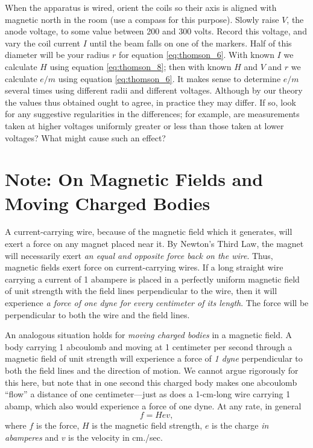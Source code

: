 When the apparatus is wired, orient the coils so their axis is aligned
with magnetic north in the room (use a compass for
this purpose). Slowly raise $V$, the anode voltage, to some value between 200 and 300 volts. 
Record this voltage, and vary the coil current $I$ until the beam falls on one
of the markers. Half of this diameter will be your radius $r$ for equation \eqref{eq:thomson_6}. 
With known $I$ we calculate $H$ using equation
\eqref{eq:thomson_8}; then with known $H$ and $V$ and $r$ we calculate
$e/m$ using equation \eqref{eq:thomson_6}. It makes sense to determine $e/m$
several times using different radii and different voltages. Although by
our theory the values thus obtained ought to agree, in practice they may
differ. If so, look for any suggestive regularities in the differences;
for example, are measurements taken at higher voltages uniformly greater
or less than those taken at lower voltages? What might cause such an
effect?


\section*{Note: On Magnetic Fields and Moving Charged Bodies}\label{n:thomson}

A current-carrying wire, because of the magnetic field which it generates,
will exert a force on any magnet placed near it. By Newton's Third Law,
the magnet will necessarily exert \emph{an equal and opposite force back
on the wire}. Thus, magnetic fields exert force on current-carrying
wires. If a long straight wire carrying a current of 1 abampere is
placed in a perfectly uniform magnetic field of unit strength with the
field lines perpendicular to the wire, then it will experience \emph{a
force of one dyne for every centimeter of its length}. The force will be
perpendicular to both the wire and the field lines.

An analogous situation holds for \emph{moving charged bodies} in a
magnetic field. A body carrying 1 abcoulomb and moving at 1 centimeter
per second through a magnetic field of unit strength will experience a
force of \emph{1 dyne} perpendicular to both the field lines and the
direction of motion. We cannot argue rigorously for this here, but note
that in one second this charged body makes one abcoulomb ``flow'' a
distance of one centimeter---just as does a 1-cm-long wire carrying 1
abamp, which also would experience a force of one dyne. At any rate, in
general
\begin{equation*}
f = Hev ,
\end{equation*}
where $f$ is the force, $H$ is the magnetic field strength,
$e$ is the charge \emph{in abamperes} and $v$ is the velocity
in cm./sec.

